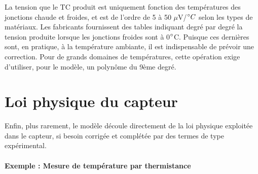 La tension que le TC produit est uniquement fonction des températures des jonctions chaude et froides, et est de l'ordre de 5 à 50 $\mu$V/$\degree C$ selon les types de matériaux. Les fabricants fournissent des tables indiquant degré par degré la tension produite lorsque les jonctions froides sont à 0$\degree$C. Puisque ces dernières sont, en pratique, à la température ambiante, il est indispensable de prévoir une correction.
Pour de grands domaines de températures, cette opération exige d'utiliser, pour le modèle, un polynôme du 9ème degré.

\section{Loi physique du capteur}
Enfin, plus rarement, le modèle découle directement de la loi physique exploitée dans le capteur, si besoin corrigée et complétée par des termes de type expérimental.

\paragraph{Exemple : Mesure de température par thermistance}

